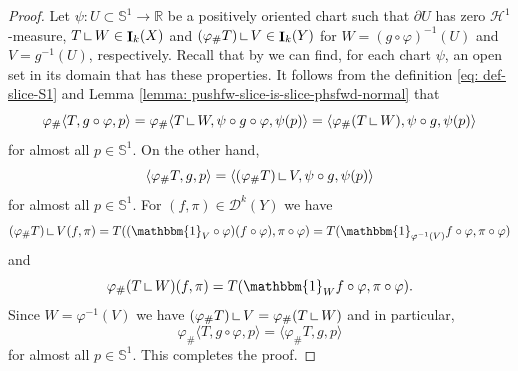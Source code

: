 \documentclass{amsart}
\numberwithin{equation}{section}
\newcommand{\R}{\mathbb{R}}
\newcommand{\Ha}{\mathcal{H}}
\newcommand{\on}{\:\mbox{\rule{0.1ex}{1.2ex}\rule{1.1ex}{0.1ex}}\:}
\DeclareMathOperator{\bI}{\mathbf{I}}
\begin{document}
        
        \begin{proof}
            Let $\psi\colon U \subset \mathbb{S}^1\to \R$ be a positively oriented chart such that $\partial U$ has zero $\Ha^1$-measure, $T\on W\in \bI_k(X)$ and $(\varphi_\#T)\on V\in \bI_k(Y)$ for $W= (g\circ\varphi)^{-1}(U)$ and $V = g^{-1}(U)$, respectively. Recall that by \cite[Theorem 5.6]{ambrosio-kirchheim-2000} we can find, for each chart $\psi$, an open set in its domain that has these properties. It follows from the definition \eqref{eq: def-slice-S1} and Lemma \ref{lemma: pushfw-slice-is-slice-phsfwd-normal} that
            $$\varphi_\#\langle T,g\circ\varphi,p\rangle = \varphi_\#\langle T\on W,\psi\circ g\circ\varphi,\psi(p)\rangle = \langle \varphi_\#(T\on W),\psi\circ g,\psi(p)\rangle$$
            for almost all $p \in \mathbb{S}^{1}$. On the other hand,
            $$\langle \varphi_\# T , g,p\rangle = \langle (\varphi_\#T)\on V,\psi\circ g,\psi(p)\rangle$$
            for almost all $p \in \mathbb{S}^1$. For $(f,\pi)\in \mathcal{D}^k(Y)$ we have
            $$(\varphi_\#T)\on V(f,\pi) = T((\mathbbm{1}_V\circ\varphi ) (f\circ\varphi),\pi\circ\varphi) = T(\mathbbm{1}_{\varphi^{-1}(V)} f\circ\varphi,\pi\circ\varphi)$$
            and
            $$ \varphi_\#(T\on W)(f,\pi)= T(\mathbbm{1}_{W} f\circ\varphi,\pi\circ\varphi).$$
            Since $W = \varphi^{-1}(V)$ we have $(\varphi_\#T)\on V=\varphi_\#(T\on W)$ and in particular,
            $$\varphi_\#\langle T, g\circ \varphi, p \rangle = \langle \varphi_\# T, g, p \rangle$$
            for almost all $p \in \mathbb{S}^1$. This completes the proof.
        \end{proof}
        
\end{document}
